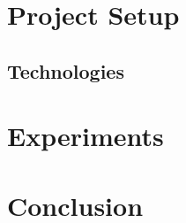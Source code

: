 \documentclass{vldb}
\begin{document}
\section{Project Setup}

\subsection{Technologies}

\section{Experiments}

\section{Conclusion}
\end{document}
